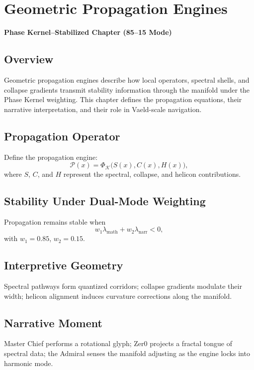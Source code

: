 
\chapter{Geometric Propagation Engines}
\textbf{Phase Kernel–Stabilized Chapter (85--15 Mode)}

\section{Overview}
Geometric propagation engines describe how local operators, spectral shells,
and collapse gradients transmit stability information through the manifold
under the Phase Kernel weighting. This chapter defines the propagation
equations, their narrative interpretation, and their role in Vaeld-scale
navigation.

\section{Propagation Operator}
Define the propagation engine:
\[
\mathcal{P}(x) = \Phi_{\mathcal{K}}\big(S(x), C(x), H(x)\big),
\]
where $S$, $C$, and $H$ represent the spectral, collapse, and helicon
contributions.

\section{Stability Under Dual-Mode Weighting}
Propagation remains stable when
\[
w_1 \lambda_{\text{math}} + w_2 \lambda_{\text{narr}} < 0,
\]
with $w_1 = 0.85$, $w_2 = 0.15$.

\section{Interpretive Geometry}
Spectral pathways form quantized corridors; collapse gradients modulate their
width; helicon alignment induces curvature corrections along the manifold.

\section{Narrative Moment}
Master Chief performs a rotational glyph; Zer0 projects a fractal tongue of
spectral data; the Admiral senses the manifold adjusting as the engine locks
into harmonic mode.
